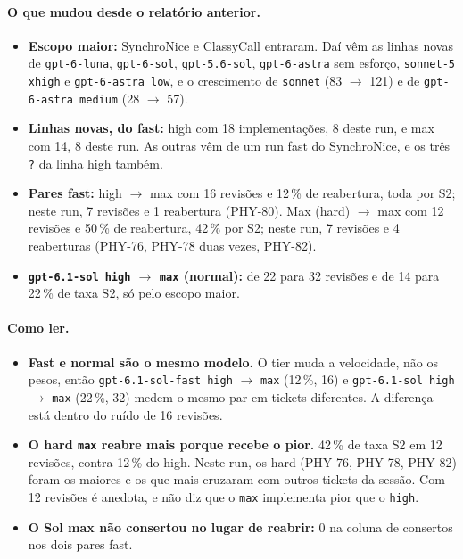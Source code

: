 \documentclass[11pt,a4paper]{article}
\begin{document}
\paragraph{O que mudou desde o relatório anterior.}
\begin{itemize}
  \item \textbf{Escopo maior:} SynchroNice e ClassyCall entraram. Daí vêm as
        linhas novas de \texttt{gpt-6-luna}, \texttt{gpt-6-sol},
        \texttt{gpt-5.6-sol}, \texttt{gpt-6-astra} sem esforço,
        \texttt{sonnet-5 xhigh} e \texttt{gpt-6-astra low}, e o crescimento de
        \texttt{sonnet} (83 $\to$ 121) e de \texttt{gpt-6-astra medium}
        (28 $\to$ 57).
  \item \textbf{Linhas novas, do fast:} high com 18 implementações, 8 deste
        run, e max com 14, 8 deste run. As outras vêm de um run fast do
        SynchroNice, e os três \texttt{?} da linha high também.
  \item \textbf{Pares fast:} high $\to$ max com 16 revisões e 12\,\% de
        reabertura, toda por S2; neste run, 7 revisões e 1 reabertura
        (PHY-80). Max (hard) $\to$ max com 12 revisões e 50\,\% de reabertura,
        42\,\% por S2; neste run, 7 revisões e 4 reaberturas (PHY-76, PHY-78
        duas vezes, PHY-82).
  \item \textbf{\texttt{gpt-6.1-sol high} $\to$ \texttt{max} (normal):} de 22
        para 32 revisões e de 14 para 22\,\% de taxa S2, só pelo escopo maior.
\end{itemize}

\paragraph{Como ler.}
\begin{itemize}
  \item \textbf{Fast e normal são o mesmo modelo.} O tier muda a velocidade,
        não os pesos, então \texttt{gpt-6.1-sol-fast high} $\to$
        \texttt{max} (12\,\%, 16) e \texttt{gpt-6.1-sol high} $\to$
        \texttt{max} (22\,\%, 32) medem o mesmo par em tickets diferentes. A
        diferença está dentro do ruído de 16 revisões.
  \item \textbf{O hard \texttt{max} reabre mais porque recebe o pior.} 42\,\%
        de taxa S2 em 12 revisões, contra 12\,\% do high. Neste run, os hard
        (PHY-76, PHY-78, PHY-82) foram os maiores e os que mais cruzaram com
        outros tickets da sessão. Com 12 revisões é anedota, e não diz que o
        \texttt{max} implementa pior que o \texttt{high}.
  \item \textbf{O Sol max não consertou no lugar de reabrir:} 0 na coluna de
        consertos nos dois pares fast.
\end{itemize}
\end{document}
